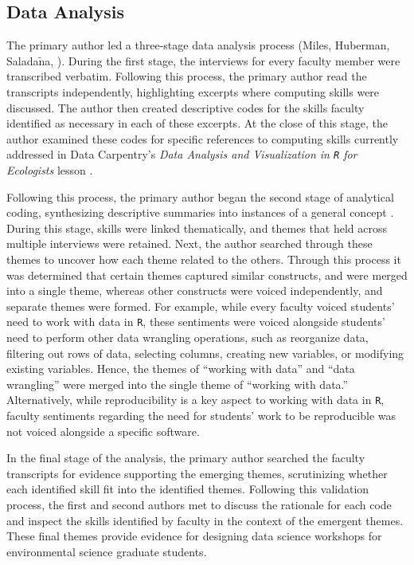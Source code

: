 \documentclass[12pt]{article}
\begin{document}
\subsection{Data Analysis} 

\quad The primary author led a three-stage data analysis process (Miles, 
Huberman, Salada$\tilde{\text{n}}$a, \citeyear{miles}). During the first stage,
the interviews for every faculty member were transcribed verbatim. Following 
this process, the primary author read the transcripts independently, 
highlighting excerpts where computing skills were discussed. The author then 
created descriptive codes for the skills faculty identified as necessary in each
of these excerpts. At the close of this stage, the author examined these codes 
for specific references to computing skills currently addressed in Data 
Carpentry's \emph{Data Analysis and Visualization in \texttt{R} for Ecologists} 
lesson \citep{ecology_curriculum}. 


\quad Following this process, the primary author began the second stage of 
analytical coding, synthesizing descriptive summaries into instances of a
general concept \citep[p.\ 95]{miles}. During this stage, skills were linked
thematically, and themes that held across multiple interviews were retained.
Next, the author searched through these themes to uncover how each theme related
to the others. Through this process it was determined that certain themes 
captured similar constructs, and were merged into a single theme, whereas other
constructs were voiced independently, and separate themes were formed. For
example, while every faculty voiced students' need to work with data in 
\texttt{R}, these sentiments were voiced alongside students' need to perform
other data wrangling operations, such as reorganize data, filtering out rows of
data, selecting columns, creating new variables, or modifying existing
variables. Hence, the themes of ``working with data'' and ``data wrangling''
were merged into the single theme of ``working with data.'' Alternatively, while
reproducibility is a key aspect to working with data in \texttt{R}, faculty
sentiments regarding the need for students' work to be reproducible was not
voiced alongside a specific software.

\quad In the final stage of the analysis, the primary author searched the 
faculty transcripts for evidence supporting the emerging themes, scrutinizing 
whether each identified skill fit into the identified themes. Following this 
validation process, the first and second authors met to discuss the rationale
for each code and inspect the skills identified by faculty in the context of the
emergent themes. These final themes provide evidence for designing data 
science workshops for environmental science graduate students. 
\end{document}
